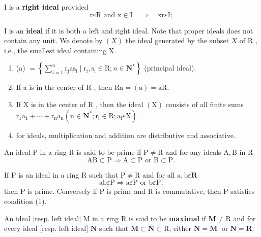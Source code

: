 I is a \textbf{right ideal} provided
$$
\mathrm{r} \varepsilon \mathrm{R} \text { and } \mathrm{x} \in \mathrm{I} \quad \Rightarrow \quad \mathrm{xr} \varepsilon \mathrm{I} \text {; }
$$

I is an \textbf{ideal} if it is both a left and right ideal. Note that proper ideals does not contain any unit. We denote by $(X)$ the ideal generated by the subset $X$ of R , i.e., the smallest ideal containing X.
\begin{theo}
    \begin{enumerate}
        \item (a) $=\left\{\sum_{i=1}^n \mathrm{r}_{\mathrm{j}} \mathrm{as}_{\mathrm{i}} \mid \mathrm{r}_{\mathrm{i}}, \mathrm{s}_{\mathrm{i}} \in \mathrm{R} ; n \in \mathbf{N}^*\right\}$ (principal ideal).
        \item If a is in the center of R , then $\mathrm{Ra}=(\mathrm{a})=\mathrm{aR}$.
        \item If X is in the center of R , then the ideal $(\mathrm{X})$ consists of all finite sums $\mathrm{r}_1 \mathrm{a}_1+\cdots+\mathrm{r}_{\mathrm{n}} \mathrm{a}_{\mathrm{n}}\left(\mathrm{n} \in \mathbf{N}^* ; \mathrm{r}_{\mathrm{i}} \in \mathrm{R} ; \mathrm{a}_{\mathrm{i}} \varepsilon \mathrm{X}\right)$.
        \item for ideals, multiplication and addition are distributive and associative.
    \end{enumerate}
\end{theo}


An ideal P in a ring R is said to be prime if $\mathrm{P} \neq \mathrm{R}$ and for any ideals $\mathrm{A}, \mathrm{B}$ in R
$$
\mathrm{AB} \subset \mathrm{P} \Rightarrow \mathrm{A} \subset \mathrm{P} \text { or } \mathrm{B} \subset \mathrm{P} \text {. }
$$
\begin{theo}
If P is an ideal in a ring R such that $\mathrm{P} \neq \mathrm{R}$ and for all $\mathrm{a}, \mathrm{b} \varepsilon \mathbf{R}$
$$
\mathrm{ab} \varepsilon \mathrm{P} \Rightarrow \mathrm{a} \varepsilon \mathrm{P} \text { or } \mathrm{b} \varepsilon \mathrm{P} \text {, }
$$
then P is prime. Conversely if P is prime and R is commutative, then P satisfies condition (1).
\end{theo}

An ideal [resp. left ideal] M in a ring R is said to be \textbf{maximal} if $\mathbf{M} \neq \mathrm{R}$ and for every ideal [resp. left ideal] $\mathbf{N}$ such that $\mathbf{M} \subset \mathbf{N} \subset \mathrm{R}$, either $\mathbf{N}=\mathbf{M}$ $\operatorname{or} \mathbf{N}=\mathbf{R}$.

